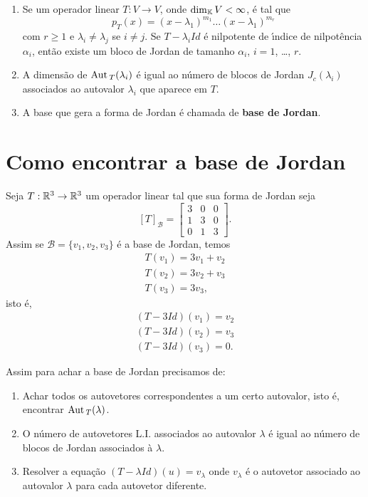 \begin{observacao}
	\begin{enumerate}[label={\arabic*})]
		\item  Se um operador linear $T : V \to V$, onde $\dim_{\mathbb{K}} V < \infty$, \'e tal que
			\[
				p_T(x) = (x - \lambda_1)^{m_1}\dots(x - \lambda_1)^{m_r}
			\]
		com $r \ge 1$ e $\lambda_i \ne \lambda_j$ se $i \ne j$. Se $T - \lambda_i Id$ \'e nilpotente de {\'\i}ndice de nilpot\^encia $\alpha_i$, ent\~ao existe um bloco de Jordan de tamanho $\alpha_i$, $i = 1$, \dots, $r$.
		\item A dimens\~ao de ${\rm Aut\,}_T(\lambda_i)$ \'e igual ao n\'umero de blocos de Jordan $J_c(\lambda_i)$ associados ao autovalor $\lambda_i$ que aparece em $T$.
		\item A base que gera a forma de Jordan \'e chamada de \textbf{base de Jordan}.
	\end{enumerate}
\end{observacao}


\section{Como encontrar a base de Jordan} %
\label{sec:base_de_jordan}

Seja $T : \mathbb{R}^3 \to \mathbb{R}^3$ um operador linear tal que sua forma de Jordan seja
\[
	[T]_\mathcal{B} = \begin{bmatrix}
		3 & 0 & 0\\
		1 & 3 & 0\\
		0 & 1 & 3
	\end{bmatrix}.
\]
Assim se $\mathcal{B} = \{v_1, v_2, v_3\}$ \'e a base de Jordan, temos
\begin{align*}
	T(v_1) = 3v_1 + v_2\\
	T(v_2) = 3v_2 + v_3\\
	T(v_3) = 3v_3,
\end{align*}
isto \'e,
\begin{align*}
	(T- 3Id)(v_1) = v_2\\
	(T - 3Id)(v_2) = v_3\\
	(T - 3Id)(v_3) = 0.
\end{align*}

Assim para achar a base de Jordan precisamos de:
\begin{enumerate}[label={\roman*})]
	\item Achar todos os autovetores correspondentes a um certo autovalor, isto \'e, encontrar ${\rm Aut\,}_T(\lambda)$.
	\item O n\'umero de autovetores L.I. associados ao autovalor $\lambda$ \'e igual ao n\'umero de blocos de Jordan associados \`a $\lambda$.
	\item Resolver a equa\c{c}\~ao $(T - \lambda Id)(u) = v_\lambda$ onde $v_\lambda$ \'e o autovetor associado ao autovalor $\lambda$ para cada autovetor diferente.
\end{enumerate}

